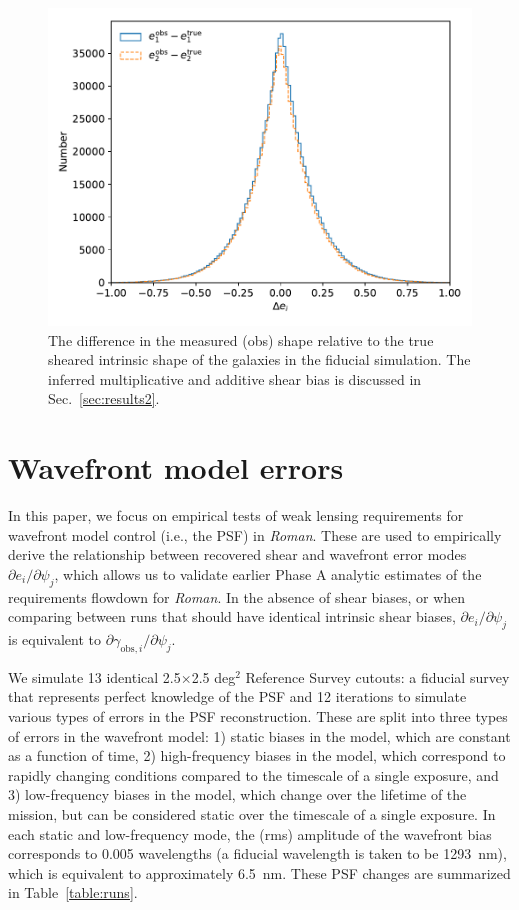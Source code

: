 \documentclass[usenatbib]{mnras}
\newcommand{\wfirst}{{\slshape Roman}}
\begin{document}
\begin{figure}
\begin{center}
\includegraphics[width=\columnwidth]{figures/shape_hist.pdf}
\end{center}
\caption[]{
The difference in the measured (obs) shape relative to the true sheared intrinsic shape of the galaxies in the fiducial simulation. The inferred multiplicative and additive shear bias is discussed in Sec.~\ref{sec:results2}. 
\label{fig:shape_hist}}
\end{figure}

\section{Wavefront model errors}\label{sec:results}

In this paper, we focus on empirical tests of weak lensing requirements for wavefront model control (i.e., the PSF) in \wfirst. These are used to empirically derive the relationship between recovered shear and wavefront error modes $\partial e_i / \partial \psi_j$, which allows us to validate earlier Phase A analytic estimates of the requirements flowdown for \wfirst. In the absence of shear biases, or when comparing between runs that should have identical intrinsic shear biases, $\partial e_i / \partial \psi_j$ is equivalent to $\partial \gamma_{\mathrm{obs},i} / \partial \psi_j$.

We simulate 13 identical 2.5$\times$2.5 deg$^2$ Reference Survey cutouts: a fiducial survey that represents perfect knowledge of the PSF and 12 iterations to simulate various types of errors in the PSF reconstruction. 
These are split into three types of errors in the wavefront model: 1) static biases in the model, which are constant as a function of time, 2) high-frequency biases in the model, which correspond to rapidly changing conditions compared to the timescale of a single exposure, and 3) low-frequency biases in the model, which change over the lifetime of the mission, but can be considered static over the timescale of a single exposure. 
In each static and low-frequency mode, the (rms) amplitude of the wavefront bias corresponds to 0.005 wavelengths (a fiducial wavelength is taken to be 1293~nm), which is equivalent to approximately 6.5~nm. These PSF changes are summarized in Table~\ref{table:runs}.
\end{document}
